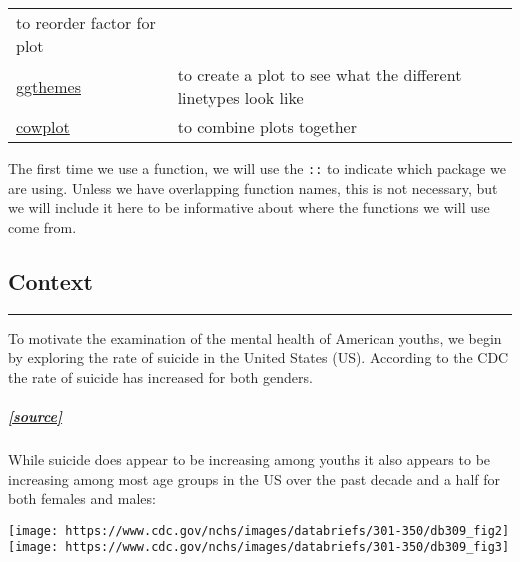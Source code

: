 \documentclass[
]{article}
\begin{document}
\begin{longtable}[]{@{}ll@{}}
\begin{minipage}[t]{0.53\columnwidth}
to reorder factor for plot\strut
\end{minipage}\tabularnewline
\begin{minipage}[t]{0.41\columnwidth}\raggedright
\href{https://cran.r-project.org/web/packages/ggthemes/ggthemes.pdf}{ggthemes}\strut
\end{minipage} & \begin{minipage}[t]{0.53\columnwidth}\raggedright
to create a plot to see what the different linetypes look like\strut
\end{minipage}\tabularnewline
\begin{minipage}[t]{0.41\columnwidth}\raggedright
\href{https://cran.r-project.org/web/packages/cowplot/vignettes/introduction.html}{cowplot}\strut
\end{minipage} & \begin{minipage}[t]{0.53\columnwidth}\raggedright
to combine plots together\strut
\end{minipage}\tabularnewline
\bottomrule
\end{longtable}

The first time we use a function, we will use the \texttt{::} to
indicate which package we are using. Unless we have overlapping function
names, this is not necessary, but we will include it here to be
informative about where the functions we will use come from.

\hypertarget{context}{%
\subsection{\texorpdfstring{\textbf{Context}}{Context}}\label{context}}

\begin{center}\rule{0.5\linewidth}{0.5pt}\end{center}

To motivate the examination of the mental health of American youths, we
begin by exploring the rate of suicide in the United States (US).
According to the CDC the rate of suicide has increased for both genders.

\hypertarget{source-3}{%
\subparagraph{\texorpdfstring{\href{https://www.cdc.gov/nchs/products/databriefs/db309.htm}{{[}source{]}}}{{[}source{]}}}\label{source-3}}

While suicide does appear to be increasing among youths it also appears
to be increasing among most age groups in the US over the past decade
and a half for both females and males:

\texttt{[image: https://www.cdc.gov/nchs/images/databriefs/301-350/db309\_fig2]}
\texttt{[image: https://www.cdc.gov/nchs/images/databriefs/301-350/db309\_fig3]}
\end{document}
